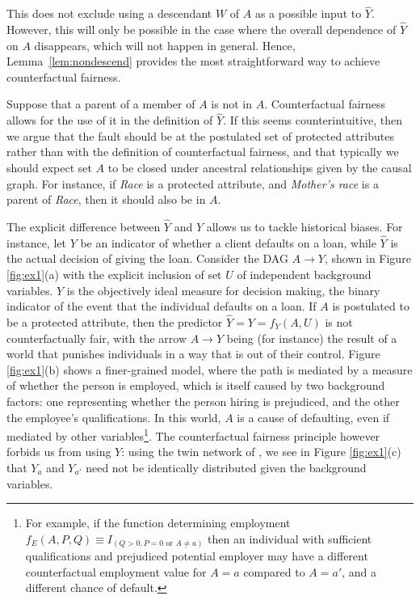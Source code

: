 This does not exclude using a descendant $W$ of $A$ as a possible input to
$\hat Y$. However, this will only be possible in the case where the
overall dependence of $\hat Y$ on $A$ disappears, which will not
happen in general. Hence, Lemma~\ref{lem:nondescend} provides the most
straightforward way to achieve counterfactual fairness.

 Suppose that
a parent of a member of $A$ is not in $A$.  Counterfactual fairness
allows for the use of it in the definition of $\hat Y$. If this seems
counterintuitive, then we argue that the fault should be at the
postulated set of protected attributes rather than with the definition
of counterfactual fairness, and that typically we should expect set
$A$ to be closed under ancestral relationships given by the causal
graph. For instance, if {\it Race} is a protected attribute, and {\it
  Mother's race} is a parent of {\it Race}, then it should also be in
$A$.

 The explicit difference
between $\hat Y$ and $Y$ allows us to tackle historical biases. For
instance, let $Y$ be an indicator of whether a client defaults on a
loan, while $\hat Y$ is the actual decision of giving the
loan. Consider the DAG $A \rightarrow Y$, shown in Figure
\ref{fig:ex1}(a) with the explicit inclusion of set $U$ of independent
background variables. $Y$ is the objectively ideal measure for
decision making, the binary indicator of the event that the individual defaults on
a loan. If $A$ is postulated to be a protected attribute, then the
predictor $\hat Y = Y = f_Y(A, U)$ is not counterfactually fair, with the arrow $A
\rightarrow Y$ being (for instance) the result of a world that
punishes individuals in a way that is out of their control. Figure
\ref{fig:ex1}(b) shows a finer-grained model, where the path is
mediated by a measure of whether the person is employed, which is
itself caused by two background factors: one representing whether the
person hiring is prejudiced, and the other the employee's
qualifications. In this world, $A$ is a cause of defaulting, even if
mediated by other variables\footnote{For example, if the function
  determining employment $f_E(A,P,Q) \equiv I_{(Q > 0, P = 0 \text{ or } A
    \neq a)}$ then an individual with sufficient qualifications and
  prejudiced potential employer may have a different counterfactual
  employment value for $A = a$ compared to $A = a'$, and a different
  chance of default. }. The counterfactual fairness principle however
forbids us from using $Y$: using the twin network of \citet{pearl:00},
we see in Figure \ref{fig:ex1}(c) that $Y_a$ and $Y_{a'}$ need not be
identically distributed given the background variables.

